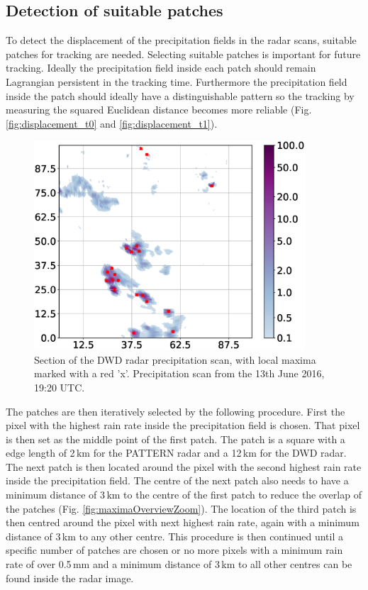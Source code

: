 \documentclass[11pt,twoside,a4paper,fleqn,x11names]{report}
\numberwithin{equation}{chapter}
\numberwithin{figure}{chapter}
\numberwithin{table}{chapter}
\begin{document}
\subsection{Detection of suitable patches}
\label{subsec:detection}
To detect the displacement of the precipitation fields in the radar scans, suitable patches for tracking are needed. Selecting suitable patches is important for future tracking. Ideally the precipitation field inside each patch should remain Lagrangian persistent in the tracking time. Furthermore the precipitation field inside the patch should ideally have a distinguishable pattern so the tracking by measuring the squared Euclidean distance becomes more reliable (Fig. \ref{fig:displacement_t0} and \ref{fig:displacement_t1}). 
\begin{figure}[!htbp]
	\centering
	\includegraphics[width=0.9\textwidth]{maximaOverview.eps}
	\caption{Section of the DWD radar precipitation scan, with local maxima marked with a red 'x'. Precipitation scan from the 13th June 2016, 19:20 UTC.}
	\label{fig:maximaOverview}
\end{figure}
The patches are then iteratively selected by the following procedure. First the pixel with the highest rain rate inside the precipitation field is chosen. That pixel is then set as the middle point of the first patch. The patch is a square with a edge length of 2\,km for the PATTERN radar and a 12\,km for the DWD radar. The next patch is then located around the pixel with the second highest rain rate inside the precipitation field. The centre of the next patch also needs to have a minimum distance of 3\,km to the centre of the first patch to reduce the overlap of the patches (Fig. \ref{fig:maximaOverviewZoom}). The location of the third patch is then centred around the pixel with next highest rain rate, again with a minimum distance of 3\,km to any other centre. This procedure is then continued until a specific number of patches are chosen or no more pixels with a minimum rain rate of over 0.5\,mm and a minimum distance of 3\,km to all other centres can be found inside the radar image.
\end{document}
